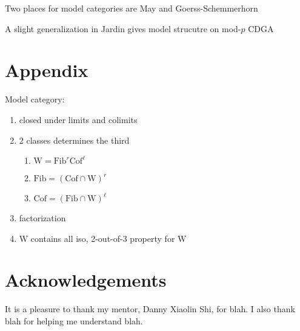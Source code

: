 \documentclass[psamsfonts]{amsart}
\theoremstyle{definition}
\theoremstyle{remark}
\newcommand{\W}{\mathrm{W}}
\newcommand{\Cof}{\mathrm{Cof}}
\newcommand{\Fib}{\mathrm{Fib}}
\numberwithin{equation}{section}
\begin{document}
Two places for model categories are May\cite{May} and Goerss-Schemmerhorn\cite{Goerss-Schemmerhorn}

A slight generalization in Jardin\cite{Jardin} gives model strucutre on mod-$p$ CDGA

\newpage
\section*{Appendix}

Model category:\begin{enumerate}
    \item closed under limits and colimits
    \item 2 classes determines the third \begin{enumerate}
        \item $\W=\Fib^r\Cof^\ell$
        \item $\Fib=(\Cof\cap\W)^r$
        \item $\Cof=(\Fib\cap\W)^\ell$
    \end{enumerate}
    \item factorization
    \item $\W$ contains all iso, 2-out-of-3 property for $\W$
\end{enumerate}

\section*{Acknowledgements}

It is a pleasure to thank my mentor, Danny Xiaolin Shi, for blah. I also thank blah for helping 
me understand blah.
\end{document}
